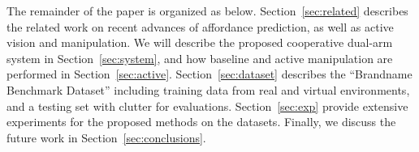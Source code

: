 The remainder of the paper is organized as below. Section~\ref{sec:related} describes the related work on recent advances of affordance prediction, as well as active vision and manipulation. We will describe the proposed cooperative dual-arm system in Section~\ref{sec:system}, and how baseline and active manipulation are performed in Section~\ref{sec:active}.  Section~\ref{sec:dataset} describes the ``Brandname Benchmark Dataset'' including training data from real and virtual environments, and a testing set with clutter for evaluations. Section~\ref{sec:exp} provide extensive experiments for the proposed methods on the datasets. Finally, we discuss the future work in Section~\ref{sec:conclusions}.
